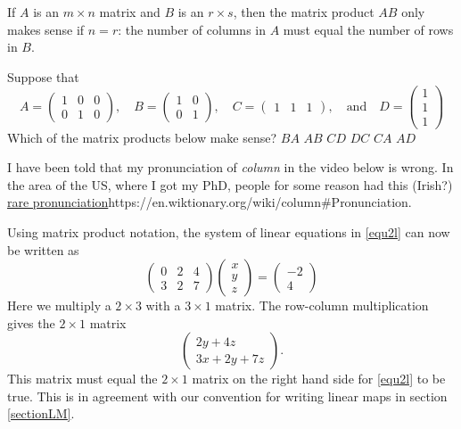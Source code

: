 \documentclass{article}
\begin{document}
\begin{frameit}
If $A$ is an  $m\times n$ matrix and $B$ is an  $r\times s$, then the matrix product $A B$ only makes sense if
$n = r$: the number of columns in $A$ must equal the number of rows in $B$. 
\end{frameit}


\begin{quizexercise}[showhide]
\begin{quiz}
\question
Suppose that 
$$
A = \begin{pmatrix} 1 & 0 & 0\\ 0 & 1 & 0 \end{pmatrix}, \quad
B = \begin{pmatrix} 1 & 0\\ 0 & 1\end{pmatrix}, \quad
C = \begin{pmatrix} 1 & 1 & 1\end{pmatrix}, \quad\text{and}\quad
D = \begin{pmatrix} 1 \\ 1 \\ 1\end{pmatrix}
$$
Which of the matrix products below make sense?
$B A$
$A B$
$C D$
$D C$
$C A$
$A D$
\end{quiz}
\end{quizexercise}

\begin{video}
  I have been told that my pronunciation of \emph{column} in the video below is wrong. In the area of the US, where I got my PhD, people for some reason had this (Irish?)
  \url{rare pronunciation}{https://en.wiktionary.org/wiki/column\#Pronunciation}.
  
\end{video}



Using matrix product notation, the system of linear equations in \eqref{equ2l} can now
be written as
$$
\begin{pmatrix}
0 & 2 & 4\\
3 & 2 & 7
\end{pmatrix} 
\begin{pmatrix} x \\ y \\ z \end{pmatrix} = 
\begin{pmatrix} -2 \\ 4 \end{pmatrix}
$$
Here we multiply a $2\times 3$ with a $3\times 1$
matrix. The row-column multiplication gives the $2\times 1$ matrix
$$
\begin{pmatrix}
2 y + 4 z\\
3 x + 2 y + 7 z
\end{pmatrix}.
$$
This matrix must equal the $2\times 1$ matrix on the right hand side
for \eqref{equ2l} to be true.
This is in agreement with our convention for writing linear maps in 
section \ref{sectionLM}.
\end{document}
